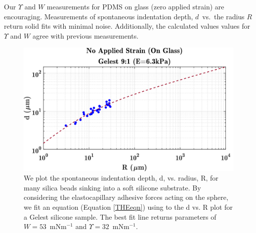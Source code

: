 Our $ \Upsilon $ and $ W $ measurements for PDMS on glass (zero applied strain) are encouraging. Measurements of spontaneous indentation depth, $ d $~vs.~the radius $ R $ return solid fits with minimal noise. Additionally, the calculated values values for $ \Upsilon $ and $ W $ agree with previous measurements. 

\begin{figure}[h!]
	\centering
	\includegraphics[width=\linewidth]{Chapters/Figures/w_ups_fit_G9-1}
	\caption[Gelest W-$\Upsilon$ Fit]{We plot the spontaneous indentation depth, d, vs. radius, R, for many silica beads sinking into a soft silicone substrate. By considering the elastocapillary adhesive forces acting on the sphere, we fit an equation (Equation \ref{THEeqn}) using to the d vs. R plot for a Gelest silicone sample. The best fit line returns parameters of $ W=53 $~mNm$^{-1}$  and $ \Upsilon=32 $~mNm$^{-1}$.}
	\label{fig:wupsfitg9-1}
\end{figure}

